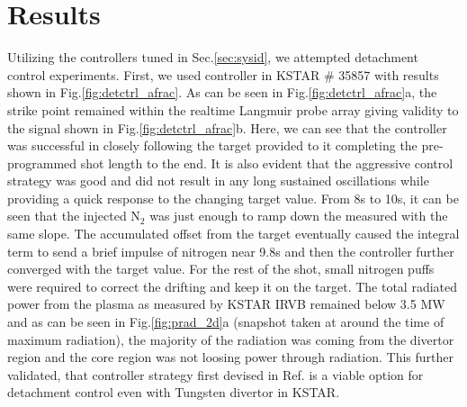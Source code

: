 \section{Results}
\label{sec:results}





Utilizing the controllers tuned in Sec.\ref{sec:sysid}, we attempted detachment control experiments.
First, we used \Afrac controller in KSTAR \# 35857 with results shown in Fig.\ref{fig:detctrl_afrac}.
As can be seen in Fig.\ref{fig:detctrl_afrac}a, the strike point remained within the realtime Langmuir probe array giving validity to the \Afrac signal shown in Fig.\ref{fig:detctrl_afrac}b.
Here, we can see that the controller was successful in closely following the target provided to it completing the pre-programmed shot length to the end.
It is also evident that the aggressive control strategy was good and did not result in any long sustained oscillations while providing a quick response to the changing target value.
From 8s to 10s, it can be seen that the injected N$_2$ was just enough to ramp down the measured \Afrac with the same slope.
The accumulated offset from the target eventually caused the integral term to send a brief impulse of nitrogen near 9.8s and then the controller further converged with the target value.
For the rest of the shot, small nitrogen puffs were required to correct the drifting \Afrac and keep it on the target.
The total radiated power from the plasma as measured by KSTAR \ac{IRVB} remained below 3.5 MW and as can be seen in Fig.\ref{fig:prad_2d}a (snapshot taken at around the time of maximum radiation), the majority of the radiation was coming from the divertor region and the core region was not loosing power through radiation.
This further validated, that \Afrac controller strategy first devised in Ref.\cite{Eldon_2022_PPCF} is a viable option for detachment control even with Tungsten divertor in KSTAR.

